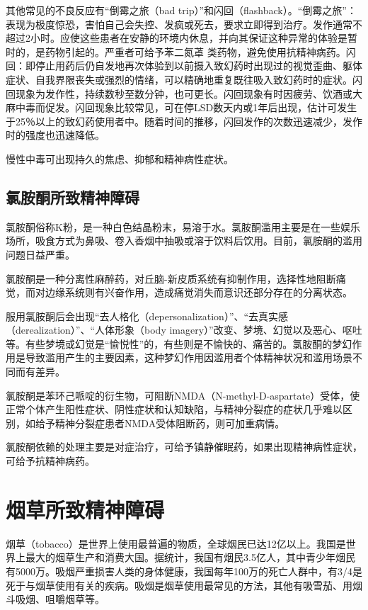 其他常见的不良反应有“倒霉之旅（bad
trip）”和闪回（flashback）。“倒霉之旅”：表现为极度惊恐，害怕自己会失控、发疯或死去，要求立即得到治疗。发作通常不超过2小时。应使这些患者在安静的环境内休息，并向其保证这种异常的体验是暂时的，是药物引起的。严重者可给予苯二氮䓬
类药物，避免使用抗精神病药。闪回：即停止用药后仍自发地再次体验到以前摄入致幻药时出现过的视觉歪曲、躯体症状、自我界限丧失或强烈的情绪，可以精确地重复既往吸入致幻药时的症状。闪回现象为发作性，持续数秒至数分钟，也可更长。闪回现象有时因疲劳、饮酒或大麻中毒而促发。闪回现象比较常见，可在停LSD数天内或1年后出现，估计可发生于25％以上的致幻药使用者中。随着时间的推移，闪回发作的次数迅速减少，发作时的强度也迅速降低。

慢性中毒可出现持久的焦虑、抑郁和精神病性症状。

\subsection{氯胺酮所致精神障碍}

氯胺酮俗称K粉，是一种白色结晶粉末，易溶于水。氯胺酮滥用主要是在一些娱乐场所，吸食方式为鼻吸、卷入香烟中抽吸或溶于饮料后饮用。目前，氯胺酮的滥用问题日益严重。

氯胺酮是一种分离性麻醉药，对丘脑-新皮质系统有抑制作用，选择性地阻断痛觉，而对边缘系统则有兴奋作用，造成痛觉消失而意识还部分存在的分离状态。

服用氯胺酮后会出现“去人格化（depersonalization）”、“去真实感（derealization）”、“人体形象（body
imagery）”改变、梦境、幻觉以及恶心、呕吐等。有些梦境或幻觉是“愉悦性”的，有些则是不愉快的、痛苦的。氯胺酮的梦幻作用是导致滥用产生的主要因素，这种梦幻作用因滥用者个体精神状况和滥用场景不同而有差异。

氯胺酮是苯环己哌啶的衍生物，可阻断NMDA（N-methyl-D-aspartate）受体，使正常个体产生阳性症状、阴性症状和认知缺陷，与精神分裂症的症状几乎难以区别，如给予精神分裂症患者NMDA受体阻断药，则可加重病情。

氯胺酮依赖的处理主要是对症治疗，可给予镇静催眠药，如果出现精神病性症状，可给予抗精神病药。

\section{烟草所致精神障碍}

烟草（tobacco）是世界上使用最普遍的物质，全球烟民已达12亿以上。我国是世界上最大的烟草生产和消费大国。据统计，我国有烟民3.5亿人，其中青少年烟民有5000万。吸烟严重损害人类的身体健康，我国每年100万的死亡人群中，有3/4是死于与烟草使用有关的疾病。吸烟是烟草使用最常见的方法，其他有吸雪茄、用烟斗吸烟、咀嚼烟草等。

